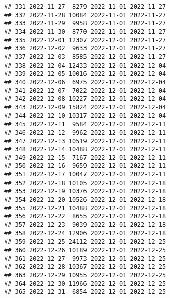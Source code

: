 \documentclass[
]{article}
\begin{document}
\begin{verbatim}
## 331 2022-11-27  8279 2022-11-01 2022-11-27
## 332 2022-11-28 10084 2022-11-01 2022-11-27
## 333 2022-11-29  9958 2022-11-01 2022-11-27
## 334 2022-11-30  8770 2022-11-01 2022-11-27
## 335 2022-12-01 12307 2022-12-01 2022-11-27
## 336 2022-12-02  9633 2022-12-01 2022-11-27
## 337 2022-12-03  8585 2022-12-01 2022-11-27
## 338 2022-12-04 12433 2022-12-01 2022-12-04
## 339 2022-12-05 10016 2022-12-01 2022-12-04
## 340 2022-12-06  6975 2022-12-01 2022-12-04
## 341 2022-12-07  7022 2022-12-01 2022-12-04
## 342 2022-12-08 10227 2022-12-01 2022-12-04
## 343 2022-12-09 15824 2022-12-01 2022-12-04
## 344 2022-12-10 10317 2022-12-01 2022-12-04
## 345 2022-12-11  9584 2022-12-01 2022-12-11
## 346 2022-12-12  9962 2022-12-01 2022-12-11
## 347 2022-12-13 10519 2022-12-01 2022-12-11
## 348 2022-12-14 10488 2022-12-01 2022-12-11
## 349 2022-12-15  7167 2022-12-01 2022-12-11
## 350 2022-12-16  9659 2022-12-01 2022-12-11
## 351 2022-12-17 10047 2022-12-01 2022-12-11
## 352 2022-12-18 10105 2022-12-01 2022-12-18
## 353 2022-12-19 10376 2022-12-01 2022-12-18
## 354 2022-12-20 10526 2022-12-01 2022-12-18
## 355 2022-12-21 10488 2022-12-01 2022-12-18
## 356 2022-12-22  8655 2022-12-01 2022-12-18
## 357 2022-12-23  9039 2022-12-01 2022-12-18
## 358 2022-12-24 12906 2022-12-01 2022-12-18
## 359 2022-12-25 24112 2022-12-01 2022-12-25
## 360 2022-12-26 10189 2022-12-01 2022-12-25
## 361 2022-12-27  9973 2022-12-01 2022-12-25
## 362 2022-12-28 10367 2022-12-01 2022-12-25
## 363 2022-12-29 10955 2022-12-01 2022-12-25
## 364 2022-12-30 11966 2022-12-01 2022-12-25
## 365 2022-12-31  6854 2022-12-01 2022-12-25
\end{verbatim}
\end{document}
